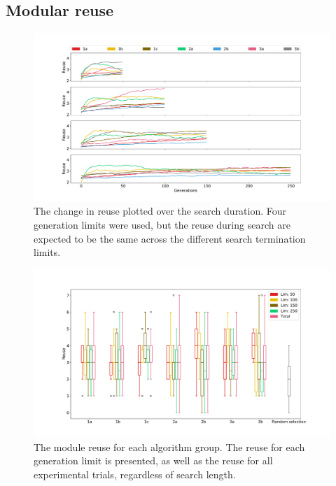 \subsection{Modular reuse}
\begin{figure}
    \includegraphics[width=1.2\textwidth, center]{Chapters/4.Experiments/exp3/figures/reuse_progression.pdf}
    \caption[Module reuse during search]{The change in reuse plotted over the search duration. Four generation limits were used, but the reuse during search are expected to be the same across the different search termination limits.}
    \label{fig:exp3.reuseprogression}
\end{figure}
\begin{figure}
    \includegraphics[width=1.25\textwidth, center]{Chapters/4.Experiments/exp3/figures/reuse_boxplot.pdf}
    \caption[Module reuse boxplot]{The module reuse for each algorithm group. The reuse for each generation limit is presented, as well as the reuse for all experimental trials, regardless of search length.}
    \label{fig:exp3.reuseboxplot}
\end{figure}

